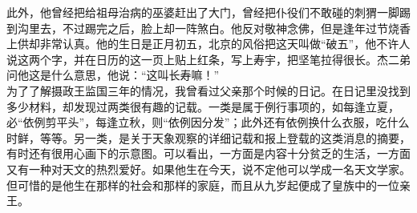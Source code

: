 此外，他曾经把给祖母治病的巫婆赶出了大门，曾经把仆役们不敢碰的刺猬一脚踢到沟里去，不过踢完之后，脸上却一阵煞白。他反对敬神念佛，但是逢年过节烧香上供却非常认真。他的生日是正月初五，北京的风俗把这天叫做“破五”，他不许人说这两个字，并在日历的这一页上贴上红条，写上寿宇，把坚笔拉得很长。杰二弟问他这是什么意思，他说：“这叫长寿嘛！”\\

为了了解摄政王监国三年的情况，我曾看过父亲那个时候的日记。在日记里没找到多少材料，却发现过两类很有趣的记载。一类是属于例行事项的，如每逢立夏，必“依例剪平头”，每逢立秋，则“依例因分发”；此外还有依例换什么衣服，吃什么时鲜，等等。另一类，是关于天象观察的详细记载和报上登载的这类消息的摘要，有时还有很用心画下的示意图。可以看出，一方面是内容十分贫乏的生活，一方面又有一种对天文的热烈爱好。如果他生在今天，说不定他可以学成一名天文学家。但可惜的是他生在那样的社会和那样的家庭，而且从九岁起便成了皇族中的一位亲王。\\